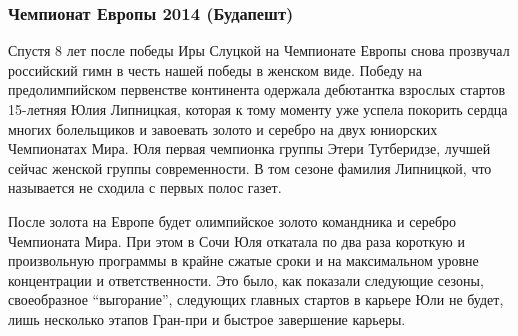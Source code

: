  
 
 
 
 
\subsubsection{Чемпионат Европы 2014 (Будапешт)}


Спустя 8 лет после победы Иры Слуцкой на Чемпионате Европы снова прозвучал
российский гимн в честь нашей победы в женском виде. Победу на предолимпийском
первенстве континента одержала дебютантка взрослых стартов 15-летняя Юлия
Липницкая, которая к тому моменту уже успела покорить сердца многих болельщиков
и завоевать золото и серебро на двух юниорских Чемпионатах Мира. Юля первая
чемпионка группы Этери Тутберидзе, лучшей сейчас женской группы современности.
В том сезоне фамилия Липницкой, что называется не сходила с первых полос газет.


После золота на Европе будет олимпийское золото командника и серебро Чемпионата
Мира. При этом в Сочи Юля откатала по два раза короткую и произвольную
программы в крайне сжатые сроки и на максимальном уровне концентрации и
ответственности. Это было, как показали следующие сезоны, своеобразное
\enquote{выгорание}, следующих главных стартов в карьере Юли не будет, лишь несколько
этапов Гран-при и быстрое завершение карьеры. 
